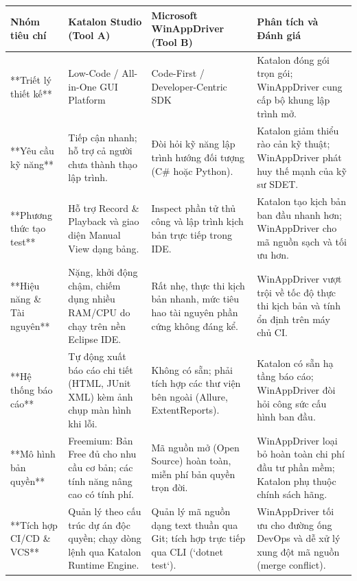 \begin{table}[H]
\centering
\begin{tabular}{|l|l|l|l|}
\hline
\textbf{Nhóm tiêu chí} & \textbf{Katalon Studio (Tool A)} & \textbf{Microsoft WinAppDriver (Tool B)} & \textbf{Phân tích và Đánh giá} \\ \hline
**Triết lý thiết kế** & Low-Code / All-in-One GUI Platform & Code-First / Developer-Centric SDK & Katalon đóng gói trọn gói; WinAppDriver cung cấp bộ khung lập trình mở. \\ \hline
**Yêu cầu kỹ năng** & Tiếp cận nhanh; hỗ trợ cả người chưa thành thạo lập trình. & Đòi hỏi kỹ năng lập trình hướng đối tượng (C# hoặc Python). & Katalon giảm thiểu rào cản kỹ thuật; WinAppDriver phát huy thế mạnh của kỹ sư SDET. \\ \hline
**Phương thức tạo test** & Hỗ trợ Record \& Playback và giao diện Manual View dạng bảng. & Inspect phần tử thủ công và lập trình kịch bản trực tiếp trong IDE. & Katalon tạo kịch bản ban đầu nhanh hơn; WinAppDriver cho mã nguồn sạch và tối ưu hơn. \\ \hline
**Hiệu năng \& Tài nguyên** & Nặng, khởi động chậm, chiếm dụng nhiều RAM/CPU do chạy trên nền Eclipse IDE. & Rất nhẹ, thực thi kịch bản nhanh, mức tiêu hao tài nguyên phần cứng không đáng kể. & WinAppDriver vượt trội về tốc độ thực thi kịch bản và tính ổn định trên máy chủ CI. \\ \hline
**Hệ thống báo cáo** & Tự động xuất báo cáo chi tiết (HTML, JUnit XML) kèm ảnh chụp màn hình khi lỗi. & Không có sẵn; phải tích hợp các thư viện bên ngoài (Allure, ExtentReports). & Katalon có sẵn hạ tầng báo cáo; WinAppDriver đòi hỏi công sức cấu hình ban đầu. \\ \hline
**Mô hình bản quyền** & Freemium: Bản Free đủ cho nhu cầu cơ bản; các tính năng nâng cao có tính phí. & Mã nguồn mở (Open Source) hoàn toàn, miễn phí bản quyền trọn đời. & WinAppDriver loại bỏ hoàn toàn chi phí đầu tư phần mềm; Katalon phụ thuộc chính sách hãng. \\ \hline
**Tích hợp CI/CD \& VCS** & Quản lý theo cấu trúc dự án độc quyền; chạy dòng lệnh qua Katalon Runtime Engine. & Quản lý mã nguồn dạng text thuần qua Git; tích hợp trực tiếp qua CLI (`dotnet test`). & WinAppDriver tối ưu cho đường ống DevOps và dễ xử lý xung đột mã nguồn (merge conflict). \\ \hline
\end{tabular}
\end{table}





